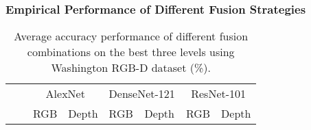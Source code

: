 \documentclass[10pt,journal,compsoc]{IEEEtran}
\begin{document}
\subsubsection{Empirical Performance of Different Fusion Strategies} \label{sec:exp.ma.fusionPerformance}
\begin{table}[!b]
\caption{Average accuracy performance of different fusion combinations on the best three levels using Washington RGB-D dataset (\%).}  
	\label{table:levelFusions}    
	\centering
	\setlength{\tabcolsep}{0.9em} \def\arraystretch{1.2}
	\begin{adjustbox}{width=\columnwidth}
\begin{tabular}{cl|ll|ll|ll|}
\cline{3-8}
\multicolumn{1}{l}{}    &       & \multicolumn{2}{c|}{AlexNet}     & \multicolumn{2}{c|}{DenseNet-121} & \multicolumn{2}{c|}{ResNet-101} \\ \cline{3-8} 
                        &     & RGB & \multicolumn{1}{l|}{Depth} & RGB                & Depth   & RGB                & Depth           \\ \hline


\end{tabular}
\end{adjustbox}
\end{table}
\end{document}
